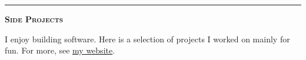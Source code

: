 \documentclass[11 pt]{article}
\begin{document}
\begin{itemize}

\end{itemize}
\hrule

\begin{center}\begin{Large}\textsc{\textbf{Side Projects}\\}\end{Large}\end{center}

I enjoy building software.  Here is a selection of projects I worked on mainly for fun.
For more, see \href{https://www.wuthejeff.com/projects}{my website}.
\end{document}
